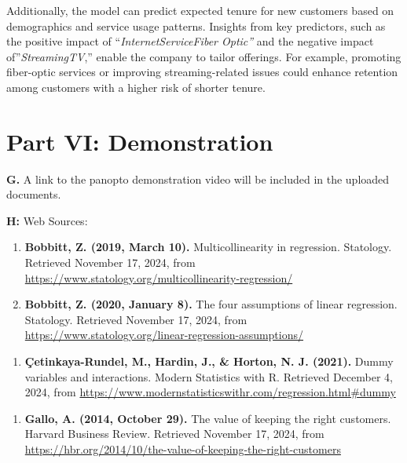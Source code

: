 \documentclass[
]{article}
\providecommand{\tightlist}{%
  \setlength{\itemsep}{0pt}\setlength{\parskip}{0pt}}
\begin{document}
Additionally, the model can predict expected tenure for new customers
based on demographics and service usage patterns. Insights from key
predictors, such as the positive impact of ``\emph{InternetServiceFiber
Optic''} and the negative impact of''\emph{StreamingTV},'' enable the
company to tailor offerings. For example, promoting fiber-optic services
or improving streaming-related issues could enhance retention among
customers with a higher risk of shorter tenure.

\section{Part VI: Demonstration}\label{part-vi-demonstration}

\textbf{G.} A link to the panopto demonstration video will be included
in the uploaded documents.

\textbf{H:} Web Sources:

\begin{enumerate}
\def\labelenumi{\arabic{enumi}.}
\item
  \textbf{Bobbitt, Z. (2019, March 10).} Multicollinearity in
  regression. Statology. Retrieved November 17, 2024, from
  \url{https://www.statology.org/multicollinearity-regression/}
\item
  \textbf{Bobbitt, Z. (2020, January 8).} The four assumptions of linear
  regression. Statology. Retrieved November 17, 2024, from
  \url{https://www.statology.org/linear-regression-assumptions/}
\end{enumerate}

\begin{enumerate}
\def\labelenumi{\arabic{enumi}.}
\setcounter{enumi}{3}
\tightlist
\item
  \textbf{Çetinkaya-Rundel, M., Hardin, J., \& Horton, N. J. (2021).}
  Dummy variables and interactions. Modern Statistics with R. Retrieved
  December 4, 2024, from
  \url{https://www.modernstatisticswithr.com/regression.html\#dummy}
\end{enumerate}

\begin{enumerate}
\def\labelenumi{\arabic{enumi}.}
\setcounter{enumi}{4}
\tightlist
\item
  \textbf{Gallo, A. (2014, October 29).} The value of keeping the right
  customers. Harvard Business Review. Retrieved November 17, 2024, from
  \url{https://hbr.org/2014/10/the-value-of-keeping-the-right-customers}
\end{enumerate}
\end{document}

